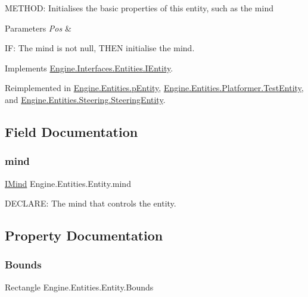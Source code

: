M\+E\+T\+H\+OD\+: Initialises the basic properties of this entity, such as the mind 


\begin{DoxyParams}{Parameters}
{\em Pos} & \\
\hline
\end{DoxyParams}
IF\+: The mind is not null, T\+H\+EN initialise the mind. 

Implements \hyperlink{a00438_a0c80525509aaeaa0d78eef908f7f7553}{Engine.\+Interfaces.\+Entities.\+I\+Entity}.



Reimplemented in \hyperlink{a00322_aad953baa984c0f958d3e96efbfc3bca9}{Engine.\+Entities.\+p\+Entity}, \hyperlink{a00330_ad4122c4f38d98746a67532d0a6836da5}{Engine.\+Entities.\+Platformer.\+Test\+Entity}, and \hyperlink{a00342_a7b1e3df5320c999d2cf1cc3b97994401}{Engine.\+Entities.\+Steering.\+Steering\+Entity}.



\subsection{Field Documentation}
\mbox{\label{a00314_a8ba8155440726f55d5e087eeecf0d12f}} 
\subsubsection{\texorpdfstring{mind}{mind}}
{\footnotesize\ttfamily \hyperlink{a00446}{I\+Mind} Engine.\+Entities.\+Entity.\+mind\hspace{0.3cm}{\ttfamily [protected]}}



D\+E\+C\+L\+A\+RE\+: The mind that controls the entity. 



\subsection{Property Documentation}
\mbox{\label{a00314_a364d5fcdaee8aa472c0b8fb35830abd8}} 
\subsubsection{\texorpdfstring{Bounds}{Bounds}}
{\footnotesize\ttfamily Rectangle Engine.\+Entities.\+Entity.\+Bounds\hspace{0.3cm}{\ttfamily [get]}}



